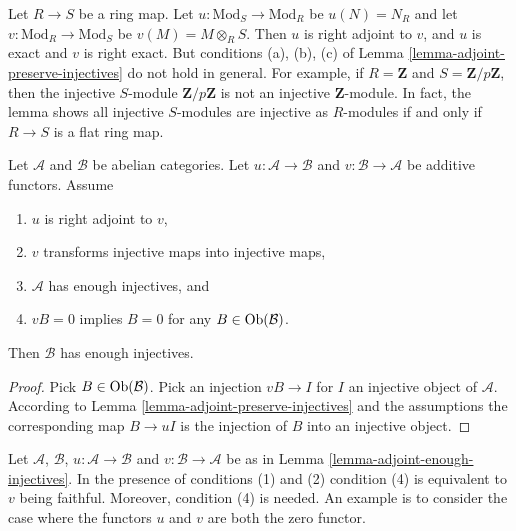 \begin{remark}
\label{remark-need-left-exactness}
Let $R \to S$ be a ring map. Let $u : \text{Mod}_S \to \text{Mod}_R$
be $u(N) = N_R$ and let $v : \text{Mod}_R \to \text{Mod}_S$ be
$v(M) = M \otimes_R S$. Then $u$ is right adjoint to $v$, and $u$ is
exact and $v$ is right exact. But conditions (a), (b), (c) of
Lemma \ref{lemma-adjoint-preserve-injectives} do not hold in general.
For example, if $R = \mathbf{Z}$ and $S = \mathbf{Z}/p\mathbf{Z}$, then
the injective $S$-module $\mathbf{Z}/p\mathbf{Z}$ is not
an injective $\mathbf{Z}$-module. In fact, the lemma shows
all injective $S$-modules are injective as $R$-modules if and only
if $R \to S$ is a flat ring map.
\end{remark}

\begin{lemma}
\label{lemma-adjoint-enough-injectives}
Let $\mathcal{A}$ and $\mathcal{B}$ be abelian categories.
Let $u : \mathcal{A} \to \mathcal{B}$ and
$v : \mathcal{B} \to \mathcal{A}$ be additive functors.
Assume
\begin{enumerate}
\item $u$ is right adjoint to $v$,
\item $v$ transforms injective maps into injective maps,
\item $\mathcal{A}$ has enough injectives, and
\item $vB = 0$ implies $B = 0$ for any $B \in \mathop{\mathrm{Ob}}\nolimits(\mathcal{B})$.
\end{enumerate}
Then $\mathcal{B}$ has enough injectives.
\end{lemma}

\begin{proof}
Pick $B \in \mathop{\mathrm{Ob}}\nolimits(\mathcal{B})$.
Pick an injection $vB \to I$ for $I$
an injective object of $\mathcal{A}$.
According to Lemma \ref{lemma-adjoint-preserve-injectives}
and the assumptions the corresponding map
$B \to uI$ is the injection of $B$ into an injective object.
\end{proof}

\begin{remark}
\label{remark-faithfulness-needed}
Let $\mathcal{A}$, $\mathcal{B}$, $u : \mathcal{A} \to \mathcal{B}$ and
$v : \mathcal{B} \to \mathcal{A}$ be as
in Lemma \ref{lemma-adjoint-enough-injectives}.
In the presence of conditions (1) and (2) condition (4) is equivalent
to $v$ being faithful. Moreover, condition (4) is needed.
An example is to consider the
case where the functors $u$ and $v$ are both the zero functor.
\end{remark}

